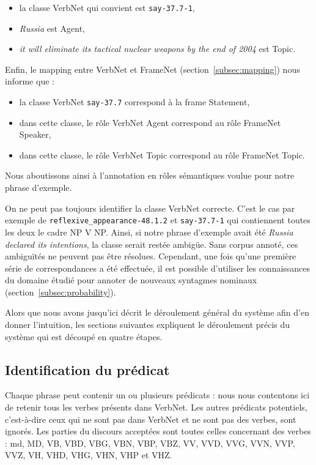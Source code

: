 \begin{itemize}
    \item la classe VerbNet qui convient est \texttt{say-37.7-1},
    \item \emph{Russia} est Agent,
    \item \emph{it will eliminate its tactical nuclear weapons by the end of 2004} est Topic.
\end{itemize}

Enfin, le mapping entre VerbNet et FrameNet (section~\ref{subsec:mapping}) nous
informe que :

\begin{itemize}
    \item la classe VerbNet \texttt{say-37.7} correspond à la frame Statement,
    \item dans cette classe, le rôle VerbNet Agent correspond au rôle FrameNet Speaker,
    \item dans cette classe, le rôle VerbNet Topic correspond au rôle FrameNet Topic.
\end{itemize}

Nous aboutissons ainsi à l'annotation en rôles sémantiques voulue pour notre
phrase d'exemple.

On ne peut pas toujours identifier la classe VerbNet correcte. C'est le cas par
exemple de \texttt{reflexive\_appearance-48.1.2} et \texttt{say-37.7-1} qui
contiennent toutes les deux le cadre NP V NP. Ainsi, si notre phrase d'exemple
avait été \emph{Russia declared its intentions}, la classe serait restée
ambigüe. Sans corpus annoté, ces ambiguïtés ne peuvent pas être résolues.
Cependant, une fois qu'une première série de correspondances a été effectuée,
il est possible d'utiliser les connaissances du domaine étudié pour annoter de
nouveaux syntagmes nominaux (section~\ref{subsec:probability}).

Alors que nous avons jusqu'ici décrit le déroulement général du système afin
d'en donner l'intuition, les sections suivantes expliquent le déroulement
précis du système qui est découpé en quatre étapes.

\subsection{Identification du prédicat}

Chaque phrase peut contenir un ou plusieurs prédicats : nous nous contentons
ici de retenir tous les verbes présents dans VerbNet. Les autres prédicats
potentiels, c'est-à-dire ceux qui ne sont pas dans VerbNet et ne sont pas des
verbes, sont ignorés. Les parties du discours acceptées sont toutes celles
concernant des verbes : md, MD, VB, VBD, VBG, VBN, VBP, VBZ, VV, VVD, VVG, VVN,
VVP, VVZ, VH, VHD, VHG, VHN, VHP et VHZ.

